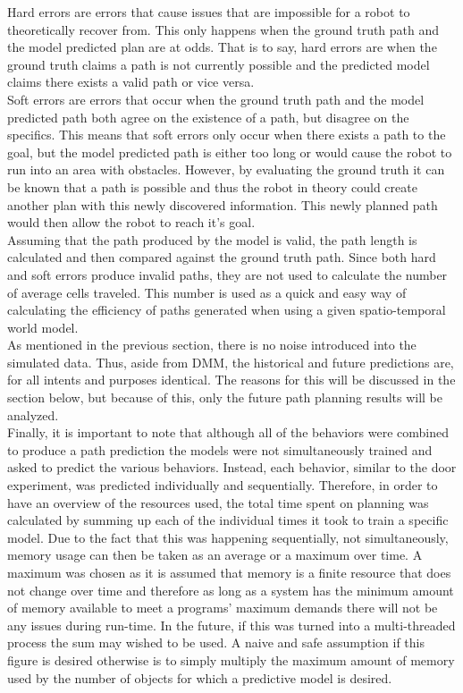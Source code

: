 Hard errors are errors that cause issues that are impossible for
a robot to theoretically recover from. This only happens when the ground truth
path and the model predicted plan are at odds. That is to say, hard errors are
when the ground truth claims a path is not currently possible and the predicted
model claims there exists a valid path or vice versa. \\

Soft errors are errors that occur when the ground truth path and the model
predicted path both agree on the existence of a path, but disagree on the
specifics. This means that soft errors only occur when there exists a path
to the goal, but the model predicted path is either too long or would cause
the robot to run into an area with obstacles. However,
by evaluating the ground truth it can be known that a path is possible and thus the robot in theory could
create another plan with this newly discovered information. This newly planned path would then allow
the robot to reach it's goal. \\

Assuming that the path produced by the model is valid, the path
length is calculated and then compared against the ground truth path. Since
both hard and soft errors produce invalid paths, they are not used to
calculate the number of average cells traveled. This number is used as a quick and
easy way of calculating the efficiency of paths generated when using a given
spatio-temporal world model. \\

As mentioned in the previous section, there is no noise introduced
into the simulated data. Thus, aside from DMM, the historical and future
predictions are, for all intents and purposes identical. The reasons for this
will be discussed in the section below, but because of this, only the future
path planning results will be analyzed. \\

Finally, it is important to note that although all of the behaviors were
combined to produce a path prediction the models were not simultaneously
trained and asked to predict the various behaviors. Instead, each behavior,
similar to the door experiment, was predicted individually and sequentially.
Therefore, in order to have an overview of the resources used, the total
time spent on planning was calculated by summing up each of the individual
times it took to train a specific model. Due to the fact that this was happening
sequentially, not simultaneously, memory usage can then be taken as an
average or a maximum over time. A maximum was chosen as it is assumed that
memory is a finite resource that does not change over time and therefore as long
as a system has the minimum amount of memory available to meet a programs'
maximum demands there will not be any issues during run-time.
In the future, if this was turned into a multi-threaded process the sum may wished to be used.
A naive and safe assumption if this figure is desired otherwise is to simply
multiply the maximum amount of memory used by the number of objects for which
a predictive model is desired. \\

